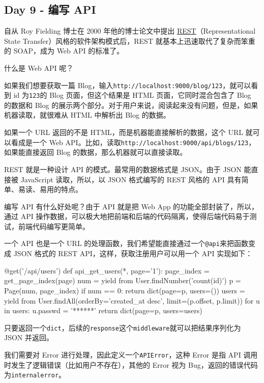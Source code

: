 \hypertarget{day-9---ux7f16ux5199-api}{%
\subsection{Day 9 - 编写 API}\label{day-9---ux7f16ux5199-api}}

自从 Roy Fielding 博士在 2000 年他的博士论文中提出
\href{http://zh.wikipedia.org/wiki/REST}{REST}（Representational State
Transfer）风格的软件架构模式后，REST 就基本上迅速取代了复杂而笨重的
SOAP，成为 Web API 的标准了。

什么是 Web API 呢？

如果我们想要获取一篇
Blog，输入\texttt{http://localhost:9000/blog/123}，就可以看到 id
为\texttt{123}的 Blog 页面，但这个结果是 HTML 页面，它同时混合包含了
Blog 的数据和 Blog
的展示两个部分。对于用户来说，阅读起来没有问题，但是，如果机器读取，就很难从
HTML 中解析出 Blog 的数据。

如果一个 URL 返回的不是 HTML，而是机器能直接解析的数据，这个 URL
就可以看成是一个 Web
API。比如，读取\texttt{http://localhost:9000/api/blogs/123}，如果能直接返回
Blog 的数据，那么机器就可以直接读取。

REST 就是一种设计 API 的模式。最常用的数据格式是 JSON。由于 JSON
能直接被 JavaScript 读取，所以，以 JSON 格式编写的 REST 风格的 API
具有简单、易读、易用的特点。

编写 API 有什么好处呢？由于 API 就是把 Web App
的功能全部封装了，所以，通过 API
操作数据，可以极大地把前端和后端的代码隔离，使得后端代码易于测试，前端代码编写更简单。

一个 API 也是一个 URL
的处理函数，我们希望能直接通过一个\texttt{@api}来把函数变成 JSON 格式的
REST API，这样，获取注册用户可以用一个 API 实现如下：

\begin{pythoncode}
@get('/api/users')
def api_get_users(*, page='1'):
    page_index = get_page_index(page)
    num = yield from User.findNumber('count(id)')
    p = Page(num, page_index)
    if num == 0:
        return dict(page=p, users=())
    users = yield from User.findAll(orderBy='created_at desc', limit=(p.offset, p.limit))
    for u in users:
        u.passwd = '******'
    return dict(page=p, users=users)
\end{pythoncode}

只要返回一个\texttt{dict}，后续的\texttt{response}这个\texttt{middleware}就可以把结果序列化为
JSON 并返回。

我们需要对 Error 进行处理，因此定义一个\texttt{APIError}，这种 Error
是指 API 调用时发生了逻辑错误（比如用户不存在），其他的 Error 视为
Bug，返回的错误代码为\texttt{internalerror}。


